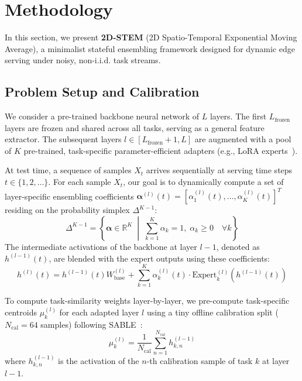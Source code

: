 \section{Methodology}
\label{sec:method}

In this section, we present \textbf{2D-STEM} (2D Spatio-Temporal Exponential Moving Average), a minimalist stateful ensembling framework designed for dynamic edge serving under noisy, non-i.i.d. task streams.

\subsection{Problem Setup and Calibration}
We consider a pre-trained backbone neural network of $L$ layers. The first $L_{\text{frozen}}$ layers are frozen and shared across all tasks, serving as a general feature extractor. The subsequent layers $l \in [L_{\text{frozen}} + 1, L]$ are augmented with a pool of $K$ pre-trained, task-specific parameter-efficient adapters (e.g., LoRA experts~\cite{hu2021lora}). 

At test time, a sequence of samples $X_t$ arrives sequentially at serving time steps $t \in \{1, 2, \dots\}$. For each sample $X_t$, our goal is to dynamically compute a set of layer-specific ensembling coefficients $\boldsymbol{\alpha}^{(l)}(t) = [\alpha_1^{(l)}(t), \dots, \alpha_K^{(l)}(t)]^T$ residing on the probability simplex $\Delta^{K-1}$:
\begin{equation}
    \Delta^{K-1} = \left\{ \boldsymbol{\alpha} \in \mathbb{R}^K \;\middle|\; \sum_{k=1}^K \alpha_k = 1, \; \alpha_k \ge 0 \quad \forall k \right\}
\end{equation}
The intermediate activations of the backbone at layer $l-1$, denoted as $h^{(l-1)}(t)$, are blended with the expert outputs using these coefficients:
\begin{equation}
    h^{(l)}(t) = h^{(l-1)}(t) W_{\text{base}}^{(l)} + \sum_{k=1}^K \alpha_k^{(l)}(t) \cdot \text{Expert}_k^{(l)}\left(h^{(l-1)}(t)\right)
\end{equation}

To compute task-similarity weights layer-by-layer, we pre-compute task-specific centroids $\mu_k^{(l)}$ for each adapted layer $l$ using a tiny offline calibration split ($N_{\text{cal}} = 64$ samples) following SABLE~\cite{sable2025}:
\begin{equation}
    \label{eq:layerwise_centroids}
    \mu_k^{(l)} = \frac{1}{N_{\text{cal}}} \sum_{n=1}^{N_{\text{cal}}} h^{(l-1)}_{k, n}
\end{equation}
where $h^{(l-1)}_{k, n}$ is the activation of the $n$-th calibration sample of task $k$ at layer $l-1$. 

